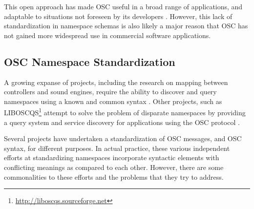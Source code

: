 \documentclass{NIME-alternate}
\begin{document}
This open approach has made OSC useful in a broad range of applications, and adaptable to situations not foreseen by its developers \cite{Wright:2005}.  However, this lack of standardization in namespace schemas is also likely a major reason that OSC has not gained more widespread use in commercial software applications.



\subsection{OSC Namespace Standardization} %
\label{sub:namespace_standardization}

A growing expanse of projects, including the research on mapping between controllers and sound engines, require the ability to discover and query namespaces using a known and common syntax \cite{Malloch:2007}. Other projects, such as LIBOSCQS\footnote{\url{http://liboscqs.sourceforge.net}} attempt to solve the problem of disparate namespaces by providing a query system and service discovery for applications using the OSC protocol \cite{Habets:2005, Schmeder:2004oscqs}.



Several projects have undertaken a standardization of OSC messages, and OSC syntax, for different purposes. In actual practice, these various independent efforts at standardizing namespaces incorporate syntactic elements with conflicting meanings as compared to each other. However, there are some commonalities to these efforts and the problems that they try to address.
\end{document}

